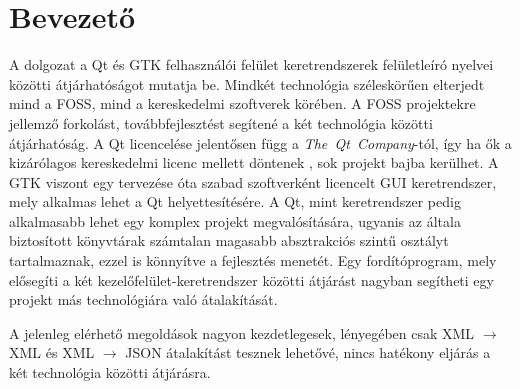 \chapter*{Bevezető}

%



A dolgozat a Qt és GTK felhasználói felület keretrendszerek felületleíró nyelvei közötti átjárhatóságot mutatja be.
Mindkét technológia széleskörűen elterjedt mind a FOSS, mind a kereskedelmi szoftverek körében. A FOSS projektekre jellemző forkolást, továbbfejlesztést segítené a két technológia közötti átjárhatóság. A Qt licencelése jelentősen függ a \textit{The~Qt~Company}-tól, így ha ők a kizárólagos kereskedelmi licenc mellett döntenek \cite{KdeQtOpenSource}, sok projekt bajba kerülhet. A GTK viszont egy tervezése óta szabad szoftverként licencelt GUI keretrendszer, mely alkalmas lehet a Qt helyettesítésére. A Qt, mint keretrendszer pedig alkalmasabb lehet egy komplex projekt megvalósítására, ugyanis az általa biztosított könyvtárak számtalan magasabb absztrakciós szintű osztályt tartalmaznak, ezzel is könnyítve a fejlesztés menetét. Egy fordítóprogram, mely elősegíti a két kezelőfelület-keretrendszer közötti átjárást nagyban segítheti egy projekt más technológiára való átalakítását.

A jelenleg elérhető megoldások nagyon kezdetlegesek, lényegében csak XML $ \rightarrow $ XML és XML $ \rightarrow $ JSON átalakítást tesznek lehetővé, nincs hatékony eljárás a két technológia közötti átjárásra.
